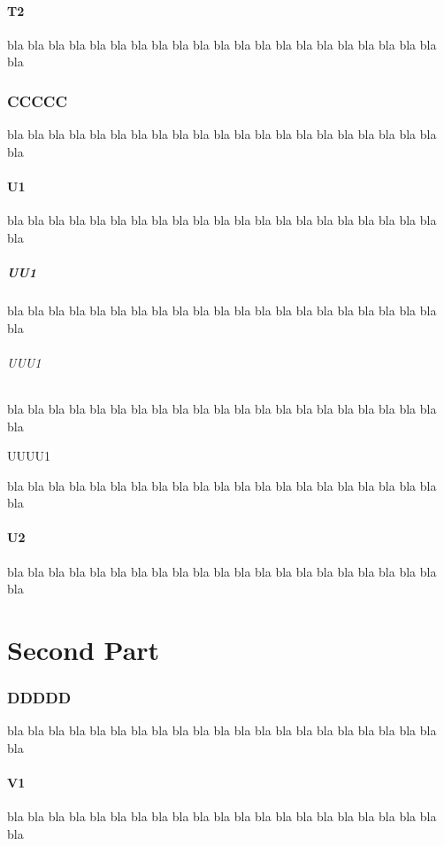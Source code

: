 \documentclass[12pt,a4paper]{article}
\begin{document}
\subsection{T2}
bla bla bla bla bla bla bla bla bla bla bla
bla bla bla bla bla bla bla bla bla bla bla
\section*{CCCCC}         %
bla bla bla bla bla bla bla bla bla bla bla
bla bla bla bla bla bla bla bla bla bla bla
\subsection{U1}
bla bla bla bla bla bla bla bla bla bla bla
bla bla bla bla bla bla bla bla bla bla bla
\subsubsection{UU1}
bla bla bla bla bla bla bla bla bla bla bla
bla bla bla bla bla bla bla bla bla bla bla
\paragraph{UUU1}
bla bla bla bla bla bla bla bla bla bla bla
bla bla bla bla bla bla bla bla bla bla bla
\subparagraph{UUUU1}
bla bla bla bla bla bla bla bla bla bla bla
bla bla bla bla bla bla bla bla bla bla bla
\subsection{U2}
bla bla bla bla bla bla bla bla bla bla bla
bla bla bla bla bla bla bla bla bla bla bla
\part{Second Part}
\parttoc
\partlof[c]
\section{DDDDD}          %
bla bla bla bla bla bla bla bla bla bla bla
bla bla bla bla bla bla bla bla bla bla bla
\subsection{V1}
bla bla bla bla bla bla bla bla bla bla bla
bla bla bla bla bla bla bla bla bla bla bla
\end{document}
